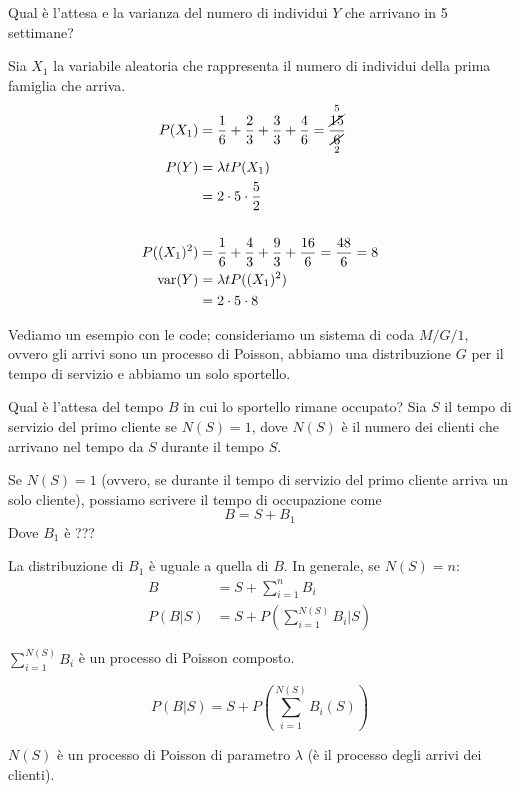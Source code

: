 \documentclass[a4paper,12pt]{book}
\begin{document}
Qual è l'attesa e la varianza del numero di individui $ Y $ che arrivano in 5 settimane?

Sia $ X_1 $ la variabile aleatoria che rappresenta il numero di individui della prima famiglia che arriva. 
\begin{align*}
	P(X_1) & = \frac{1}{6} + \frac{2}{3} + \frac{3}{3} + \frac{4}{6} = \frac{\overset{5}{\cancel{15}}}{\underset{2}{\cancel{\,6\,}}} \\
	P(Y) & = \lambda t P(X_1) \\
	& = 2 \cdot 5 \cdot \frac{5}{2}\\
	\\
	P((X_1)^2) & = \frac{1}{6} + \frac{4}{3} + \frac{9}{3} + \frac{16}{6} = \frac{48}{6} = 8 \\
	\text{var}(Y) & = \lambda t P((X_1)^2) \\
	& = 2\cdot 5 \cdot 8	
\end{align*}


Vediamo un esempio con le code; consideriamo un sistema di coda $ M/G/1 $, ovvero gli arrivi sono un processo di Poisson, abbiamo una distribuzione $ G $ per il tempo di servizio e abbiamo un solo sportello. 

Qual è l'attesa del tempo $ B $ in cui lo sportello rimane occupato? Sia $ S $ il tempo di servizio del primo cliente se $ N(S) = 1 $, dove $ N(S) $ è il numero dei clienti che arrivano nel tempo da $ S $ durante il tempo $ S $. %

Se $ N(S) = 1 $ (ovvero, se durante il tempo di servizio del primo cliente arriva un solo cliente), possiamo scrivere il tempo di occupazione come
$$ B = S + B_1 $$
Dove $ B_1 $ è ??? %

La distribuzione di $ B_1 $ è uguale a quella di $ B $. In generale, se $ N(S) = n $:
\begin{align*}
	B & = S + \sum_{i = 1}^{n} B_i \\
	P(B|S) & = S + P(\sum_{i=1}^{N(S)} B_i | S)
\end{align*}

$\sum_{i=1}^{N(S)}B_i$ è un processo di Poisson composto. 

$$ P(B|S) = S + P(\sum_{i=1}^{N(S)} B_i(S)) $$

$ N(S) $ è un processo di Poisson di parametro $\lambda$ (è il processo degli arrivi dei clienti). 
\end{document}
